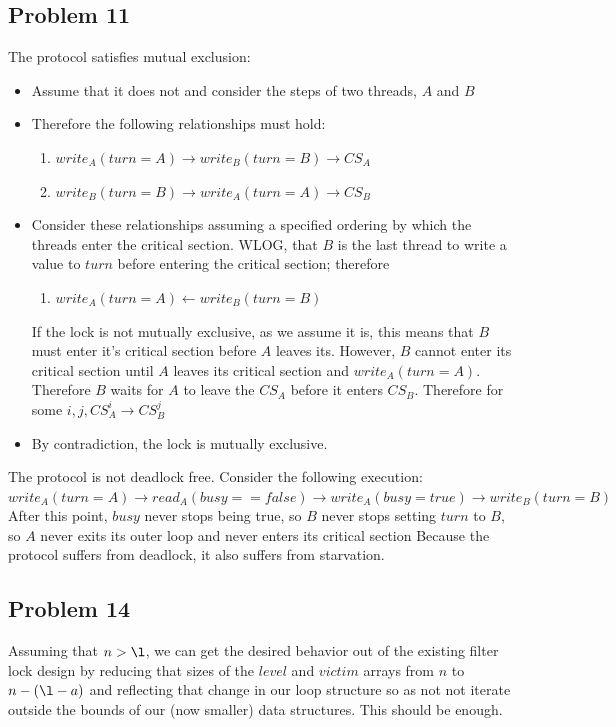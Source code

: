 \documentclass[]{article}
\begin{document}
\subsection{Problem 11}
The protocol satisfies mutual exclusion:
\begin{itemize}
	\item Assume that it does not and consider the steps of two threads, $A$ and $B$
	\item Therefore the following relationships must hold:
	\begin{enumerate}
		\item $write_A(turn = A) \rightarrow write_B(turn = B) \rightarrow CS_A$
		\item $write_B(turn = B) \rightarrow write_A(turn = A) \rightarrow CS_B$
	\end{enumerate}
	\item Consider these relationships assuming a specified ordering by which the threads enter the critical section. WLOG,  that $B$ is the last thread to write a value to $turn$ before entering the critical section; therefore
	\begin{enumerate}
		\item $write_A(turn = A) \leftarrow write_B(turn = B)$
	\end{enumerate}
	If the lock is not mutually exclusive, as we assume it is, this means that $B$ must enter it's critical section before $A$ leaves its. However, $B$ cannot enter its critical section until $A$ leaves its critical section and $write_A(turn = A)$. Therefore $B$ waits for $A$ to leave the $CS_A$ before it enters $CS_B$. Therefore for some $i, j, CS_A^i \rightarrow CS_B^j$
	\item By contradiction, the lock is mutually exclusive.
\end{itemize}
The protocol is not deadlock free. Consider the following execution:
	$write_A(turn = A) \rightarrow read_A(busy == false) \rightarrow write_A(busy = true)\rightarrow write_B(turn = B)$
After this point, $busy$ never stops being true, so $B$ never stops setting $turn$ to $B$, so $A$ never exits its outer loop and never enters its critical section
Because the protocol suffers from deadlock, it also suffers from starvation.
\subsection{Problem 14}
Assuming that $n > \l$, we can get the desired behavior out of the existing filter lock design by reducing that sizes of the $level$ and $victim$ arrays from $n$ to $n - (\l - a)$ and reflecting that change in our loop structure so as not not iterate outside the bounds of our (now smaller) data structures. This should be enough.
\end{document}
